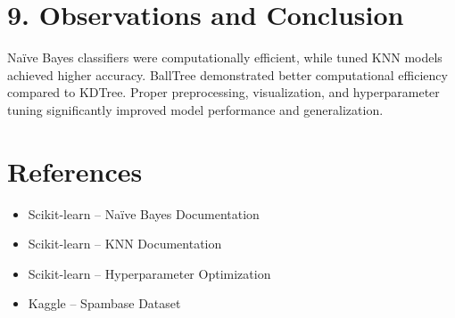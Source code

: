 \documentclass[11pt]{article}
\begin{document}

\section*{9. Observations and Conclusion}
Naïve Bayes classifiers were computationally efficient, while tuned KNN models achieved higher accuracy. BallTree demonstrated better computational efficiency compared to KDTree. Proper preprocessing, visualization, and hyperparameter tuning significantly improved model performance and generalization.

\section*{References}
\begin{itemize}
\item Scikit-learn – Naïve Bayes Documentation
\item Scikit-learn – KNN Documentation
\item Scikit-learn – Hyperparameter Optimization
\item Kaggle – Spambase Dataset
\end{itemize}
\end{document}
